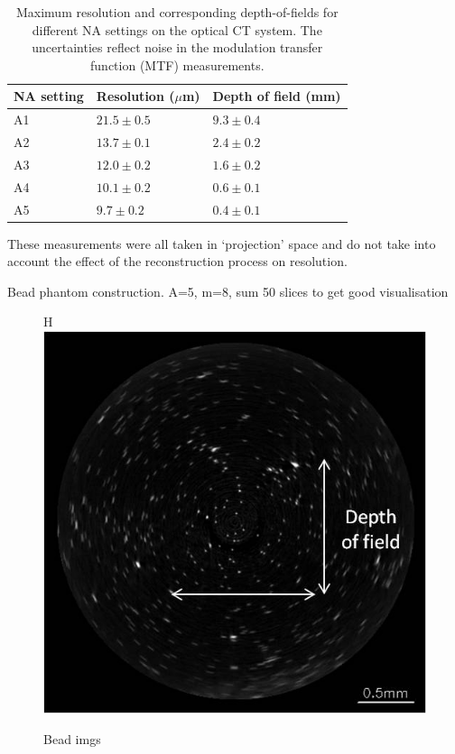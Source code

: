 	\begin{table}[H]
		\centering
		\begin{tabular}{ p{2.5cm}  p{3.5cm} p{4.5cm}  }
			\hline
			\textbf{NA setting} & \textbf{Resolution ($\mu$m)} &\textbf{Depth of field (mm)}  \\ \hline
			A1  & $21.5 \pm 0.5$ & $9.3 \pm 0.4$ \\ %
			A2  & $13.7 \pm 0.1$ & $2.4 \pm 0.2$ \\ %
			A3  & $12.0 \pm 0.2$ & $1.6 \pm 0.2$ \\ %
			A4  & $10.1 \pm 0.2$ & $0.6 \pm 0.1$ \\ %
			A5  & $9.7 \pm 0.2$ & $0.4 \pm 0.1$ \\ \hline		
		\end{tabular}
		\caption{Maximum resolution and corresponding depth-of-fields for different NA settings on the optical CT system. The uncertainties reflect noise in the modulation transfer function (MTF)  measurements.}
		\label{table:DOFNA}
	\end{table}



These measurements were all taken in `projection' space and do not take into account the effect of the reconstruction process on resolution. 

Bead phantom construction. A=5, m=8, sum 50 slices to get good visualisation

\begin{figure}{H}
\centering
\includegraphics[width=0.7\linewidth]{meth_img/bead_DOF_d2_res_test_1_10_15_scan5.jpg}
\caption{Bead imgs}
\label{fig:bead_DOF}
\end{figure}





















